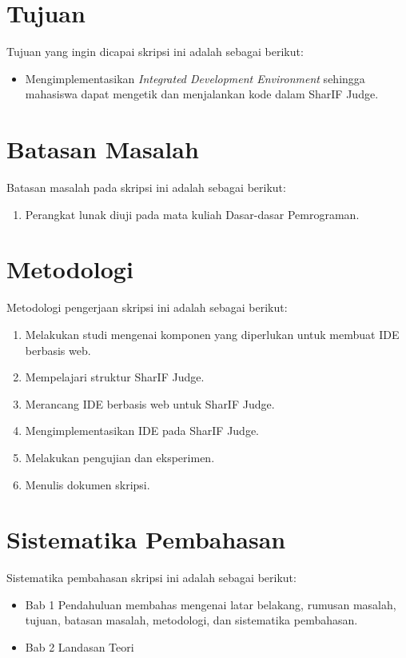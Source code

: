 \section{Tujuan}
\label{sec:tujuan}
Tujuan yang ingin dicapai skripsi ini adalah sebagai berikut:
\begin{itemize}
	\item Mengimplementasikan {\it Integrated Development Environment} sehingga mahasiswa dapat mengetik dan menjalankan kode dalam SharIF Judge.
\end{itemize}

\section{Batasan Masalah}
\label{sec:batasan}
Batasan masalah pada skripsi ini adalah sebagai berikut:
\begin{enumerate}
	\item Perangkat lunak diuji pada mata kuliah Dasar-dasar Pemrograman.
\end{enumerate}

\section{Metodologi}
\label{sec:metlit}
Metodologi pengerjaan skripsi ini adalah sebagai berikut:
\begin{enumerate}
	\item Melakukan studi mengenai komponen yang diperlukan untuk membuat IDE berbasis web.
	\item Mempelajari struktur SharIF Judge.
	\item Merancang IDE berbasis web untuk SharIF Judge.
	\item Mengimplementasikan IDE pada SharIF Judge.
	\item Melakukan pengujian dan eksperimen.
	\item Menulis dokumen skripsi.
\end{enumerate}

\section{Sistematika Pembahasan}
\label{sec:sispem}
Sistematika pembahasan skripsi ini adalah sebagai berikut:
\begin{itemize}
	\item Bab 1 Pendahuluan membahas mengenai latar belakang, rumusan masalah, tujuan, batasan masalah, metodologi, dan sistematika pembahasan.
	\item Bab 2 Landasan Teori
\end{itemize}
